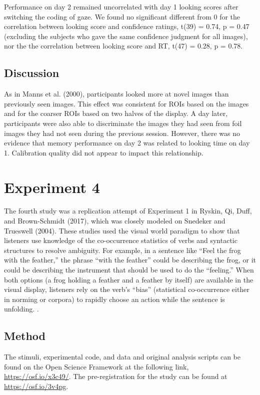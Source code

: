 \documentclass[
  man,floatsintext]{apa6}
\begin{document}
Performance on day 2 remained uncorrelated with day 1 looking scores after switching the coding of gaze. We found no significant different from 0 for the correlation between looking score and confidence ratings, t(39) = 0.74, p = 0.47 (excluding the subjects who gave the same confidence judgment for all images), nor the the correlation between looking score and RT, t(47) = 0.28, p = 0.78.

\subsection{Discussion}\label{discussion-3}

As in Manns et al. (2000), participants looked more at novel images than previously seen images. This effect was consistent for ROIs based on the images and for the coarser ROIs based on two halves of the display. A day later, participants were also able to discriminate the images they had seen from foil images they had not seen during the previous session. However, there was no evidence that memory performance on day 2 was related to looking time on day 1. Calibration quality did not appear to impact this relationship.

\section{Experiment 4}\label{experiment-4}

The fourth study was a replication attempt of Experiment 1 in
Ryskin, Qi, Duff, and Brown-Schmidt (2017), which was closely modeled on
Snedeker and Trueswell (2004). These studies used the
visual world paradigm to show that listeners use knowledge of the
co-occurrence statistics of verbs and syntactic structures to resolve
ambiguity. For example, in a sentence like ``Feel the frog with the
feather,'' the phrase ``with the feather'' could be describing the frog, or
it could be describing the instrument that should be used to do the
``feeling.'' When both options (a frog holding a feather and a feather by
itself) are available in the visual display, listeners rely on the
verb's ``bias'' (statistical co-occurrence either in norming or corpora)
to rapidly choose an action while the sentence is unfolding. .

\subsection{Method}\label{method-4}

The stimuli, experimental code, and data and original analysis scripts can be
found on the Open Science Framework at the following link,
\url{https://osf.io/x3c49/}. The pre-registration
for the study can be found at \url{https://osf.io/3v4pg}.
\end{document}

